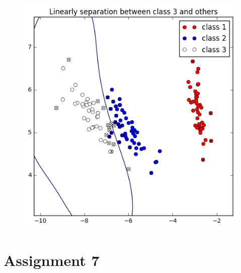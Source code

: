 \documentclass[a4paper,11pt]{article}
\begin{document}
\begin{figure}[htbp]
  \includegraphics[scale=0.3]{nl3_12.png}
\end{figure}

\section*{Assignment 7}
\end{document}
